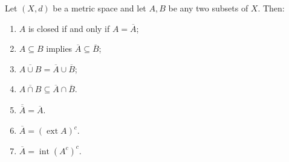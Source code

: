 \documentclass[12pt, a4paper]{article}
\begin{document}
\clearpage

\begin{theorem}
Let $(X,d)$ be a metric space and let $A,B$ be any two subsets of $X$. Then:
\begin{enumerate}       
    \item $A$ is closed if and only if $A=\overline{A}$;
    
    \item $A\subseteq B$ implies $\overline{A}\subseteq \overline{B}$;
    
    \item $\overline{A\cup B}=\overline{A}\cup \overline{B}$;
    
    \item $\overline{A\cap B}\subseteq \overline{A}\cap \overline{B}$.
    \item $\overline{\overline{A}}=\overline{A}$.
    \item $\overline{A}=(\operatorname{ext}A)^c$.
    \item   $\overline{A}=\operatorname{int}(A^c)^c$.
\end{enumerate}
    
\end{theorem}

\clearpage




\clearpage

\EndPage
\end{document}
